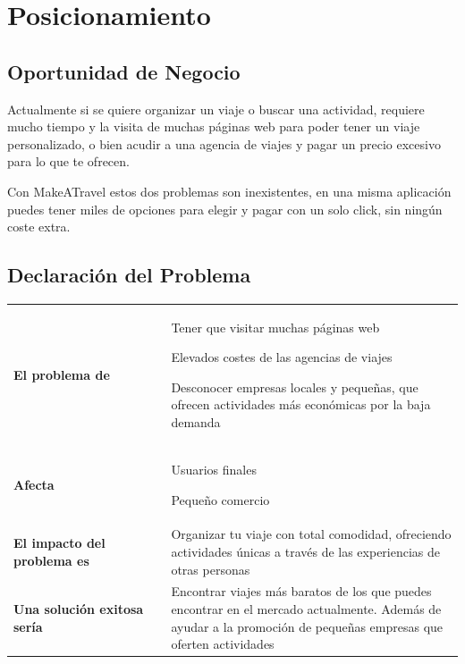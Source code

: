 \documentclass[11pt]{article}
\begin{document}
\section{Posicionamiento}
\subsection{Oportunidad de Negocio}
Actualmente si se quiere organizar un viaje o buscar una actividad,  requiere mucho tiempo y la visita de muchas páginas web para poder tener un viaje personalizado, o bien acudir a una agencia de viajes y pagar un precio excesivo para lo que te ofrecen.

Con MakeATravel estos dos problemas son inexistentes, en una misma aplicación puedes tener miles de opciones para elegir y pagar con un solo click, sin ningún coste extra.

\subsection{Declaración del Problema}

\begin{table}[H]
  \centering
  \begin{tabular}{p{0.35\linewidth}|p{0.65\linewidth}}
    \toprule
    \textbf{El problema de} & Tener que visitar muchas páginas web
    
    Elevados costes de las agencias de viajes
    
    Desconocer empresas locales y pequeñas, que ofrecen actividades más económicas por la baja demanda\\
    \textbf{Afecta} & Usuarios finales 
    
    Pequeño comercio\\
    \textbf{El impacto del problema es} & Organizar tu viaje con total comodidad, ofreciendo actividades únicas a través de las experiencias de otras personas\\
    \textbf{Una solución exitosa sería} & Encontrar viajes más baratos de los que puedes encontrar en el mercado actualmente. Además de ayudar a la promoción de pequeñas empresas que oferten actividades\\
    \bottomrule
  \end{tabular}
\end{table}
\end{document}
